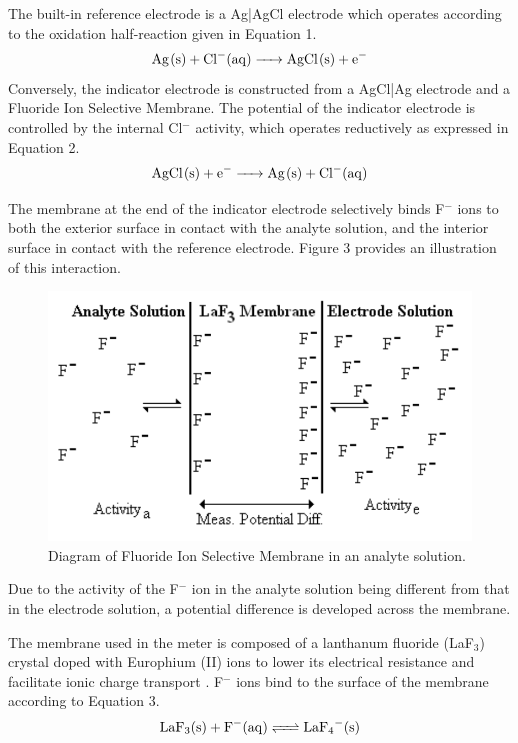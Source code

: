 \documentclass[journal=jacsat,manuscript=article,layout=twocolumn]{achemso}
\begin{document}
The built-in reference electrode is a Ag|AgCl electrode which operates according
to the oxidation half-reaction given in Equation 1.
\begin{equation}
    \ce {Ag(s) + Cl-(aq) -> AgCl(s) + e-}
\end{equation}
Conversely, the indicator electrode is constructed from a AgCl|Ag electrode and a Fluoride
Ion Selective Membrane. 
The potential of the indicator electrode is controlled by the internal Cl$^-$
activity, which operates reductively as expressed in Equation 2.
\begin{equation}
    \ce {AgCl(s) + e- -> Ag(s) + Cl-(aq)}
\end{equation}

The membrane at the end of the indicator electrode selectively binds F$^-$ ions to both the exterior surface in
contact with the analyte solution, and the interior surface in contact with the
reference electrode. Figure 3 provides an illustration of this interaction.
\begin{figure}
    \includegraphics[scale=0.6]{membrane}
    \caption{Diagram of Fluoride Ion Selective Membrane in an analyte
    solution.}
\end{figure}

Due to the activity of the F$^-$ ion in the analyte solution being different from
that in the electrode solution, a potential difference is developed across the
membrane. 

The membrane used in the meter is composed of a lanthanum fluoride (LaF$_3$)
crystal doped with Europhium (II) ions to lower its electrical resistance and
facilitate ionic charge transport \cite{nmt}.
F$^-$ ions bind to the surface of the membrane according to Equation 3.
\begin{equation}
    \ce {LaF3(s) + F^-(aq) <=> LaF4^-(s)}
\end{equation}
\end{document}
